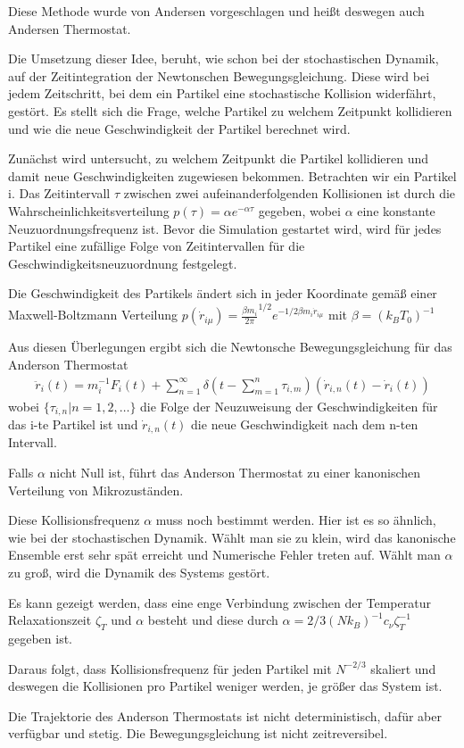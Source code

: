 \documentclass[]{article}
\begin{document}
Diese Methode wurde von Andersen vorgeschlagen und heißt deswegen auch Andersen Thermostat. 

Die Umsetzung dieser Idee, beruht, wie schon bei der stochastischen Dynamik, auf der Zeitintegration der Newtonschen Bewegungsgleichung. Diese wird bei jedem Zeitschritt, bei dem ein Partikel eine stochastische Kollision widerfährt,  gestört. Es stellt sich die Frage, welche Partikel zu welchem Zeitpunkt kollidieren und wie die neue Geschwindigkeit der Partikel berechnet wird.  

Zunächst wird untersucht, zu welchem Zeitpunkt die Partikel kollidieren und damit neue Geschwindigkeiten zugewiesen bekommen. Betrachten wir ein Partikel i. Das Zeitintervall $\tau$ zwischen zwei aufeinanderfolgenden Kollisionen ist durch die Wahrscheinlichkeitsverteilung $p(\tau)= \alpha e^{- \alpha \tau}$ gegeben, wobei $\alpha$ eine konstante Neuzuordnungsfrequenz ist.
Bevor die Simulation gestartet wird, wird für jedes Partikel eine zufällige Folge von Zeitintervallen für die Geschwindigkeitsneuzuordnung festgelegt. 

Die Geschwindigkeit des Partikels ändert sich in jeder Koordinate gemäß einer Maxwell-Boltzmann Verteilung $p(\dot{r}_{i \mu}) = {\frac{\beta m_i}{2 \pi}}^{1/2} e^{-1/2 \beta m_i \dot{r}_{i \mu}}$ mit $\beta = (k_B T_0)^{-1}$
  
Aus diesen Überlegungen ergibt sich die Newtonsche Bewegungsgleichung für das Anderson Thermostat
\begin{align*}
	\ddot{r}_i(t) = m_i^{-1} F_i(t) + \sum\limits_{n=1}^{\infty} \delta \left(  t - \sum\limits_{m=1}^n \tau_{i,m}\right) \left( \dot{r}_{i,n}(t) - \dot{r}_i(t) \right)
\end{align*}  
wobei $\{\tau_{i,n}| n=1,2, \dots\}$ die Folge der Neuzuweisung der Geschwindigkeiten für das i-te Partikel ist und $\dot{r}_{i,n}(t)$ die neue Geschwindigkeit nach dem n-ten Intervall.
 
Falls $\alpha $ nicht Null ist, führt das Anderson Thermostat zu einer kanonischen Verteilung von Mikrozuständen. 

Diese Kollisionsfrequenz $\alpha$ muss noch bestimmt werden. Hier ist es so ähnlich, wie bei der stochastischen Dynamik. Wählt man sie zu klein, wird das kanonische Ensemble erst sehr spät erreicht und Numerische Fehler treten auf. Wählt man $\alpha$ zu groß, wird die Dynamik des Systems gestört.

Es kann gezeigt werden, dass eine enge Verbindung zwischen der Temperatur Relaxationszeit $ \zeta_T$ und $\alpha$ besteht und diese durch $\alpha = 2/3 (N k_B)^{-1} c_{\nu} \zeta_T^{-1}$ gegeben ist. 

Daraus folgt, dass Kollisionsfrequenz für jeden Partikel mit $N^{-2/3}$ skaliert und deswegen die Kollisionen pro Partikel weniger werden, je größer das System ist. 

Die Trajektorie des Anderson Thermostats ist nicht deterministisch, dafür aber verfügbar und stetig. Die Bewegungsgleichung ist nicht zeitreversibel.

\end{document}

